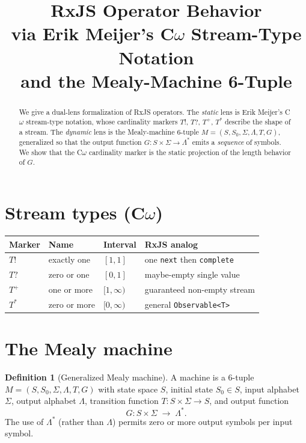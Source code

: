 \documentclass[11pt]{article}
\title{RxJS Operator Behavior\\
       \large via Erik Meijer's C$\omega$ Stream-Type Notation\\
       and the Mealy-Machine 6-Tuple}
\author{}
\date{}
\newcommand{\Sstate}{S}
\newcommand{\Sinit}{S_0}
\newcommand{\inalph}{\Sigma}
\newcommand{\outalph}{\Lambda}
\newcommand{\trans}{T}
\newcommand{\outfun}{G}
\theoremstyle{definition}
\newtheorem{definition}{Definition}
\begin{document}
\maketitle

\begin{abstract}
We give a dual-lens formalization of RxJS operators. The \emph{static} lens is Erik Meijer's
C$\omega$ stream-type notation, whose cardinality markers $T!$, $T?$, $T^{+}$, $T^{*}$ describe
the shape of a stream. The \emph{dynamic} lens is the Mealy-machine 6-tuple
$M=(S,S_0,\Sigma,\Lambda,T,G)$, generalized so that the output function
$G:S\times\Sigma\to\Lambda^{*}$ emits a \emph{sequence} of symbols. We show that the C$\omega$
cardinality marker is the static projection of the length behavior of $G$.
\end{abstract}

\section{Stream types (C$\omega$)}
\begin{center}
\begin{tabular}{llll}
\toprule
Marker & Name & Interval & RxJS analog \\
\midrule
$T!$        & exactly one  & $[1,1]$      & one \texttt{next} then \texttt{complete} \\
$T?$        & zero or one  & $[0,1]$      & maybe-empty single value \\
$T^{+}$     & one or more  & $[1,\infty)$ & guaranteed non-empty stream \\
$T^{*}$     & zero or more & $[0,\infty)$ & general \texttt{Observable<T>} \\
\bottomrule
\end{tabular}
\end{center}

\section{The Mealy machine}
\begin{definition}[Generalized Mealy machine]
A machine is a 6-tuple $M=(\Sstate,\Sinit,\inalph,\outalph,\trans,\outfun)$ with state space
$\Sstate$, initial state $\Sinit\in\Sstate$, input alphabet $\inalph$, output alphabet
$\outalph$, transition function $\trans:\Sstate\times\inalph\to\Sstate$, and output function
\[
  \outfun : \Sstate\times\inalph \;\longrightarrow\; \outalph^{*}.
\]
The use of $\outalph^{*}$ (rather than $\outalph$) permits zero or more output symbols per
input symbol.
\end{definition}
\end{document}
